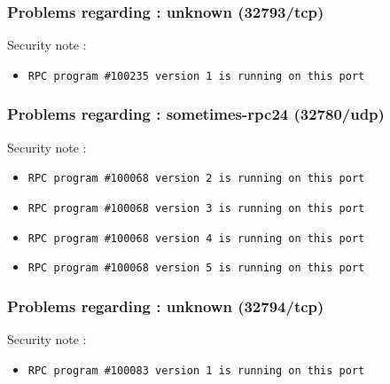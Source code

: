 \documentclass{article}
\begin{document}
\subsubsection{Problems regarding : unknown (32793/tcp)}
Security note :\\
\begin{itemize}
\item \begin{verbatim}
RPC program #100235 version 1 is running on this port
\end{verbatim}\end{itemize}
\subsubsection{Problems regarding : sometimes-rpc24 (32780/udp)}
Security note :\\
\begin{itemize}
\item \begin{verbatim}
RPC program #100068 version 2 is running on this port
\end{verbatim}\item \begin{verbatim}
RPC program #100068 version 3 is running on this port
\end{verbatim}\item \begin{verbatim}
RPC program #100068 version 4 is running on this port
\end{verbatim}\item \begin{verbatim}
RPC program #100068 version 5 is running on this port
\end{verbatim}\end{itemize}
\subsubsection{Problems regarding : unknown (32794/tcp)}
Security note :\\
\begin{itemize}
\item \begin{verbatim}
RPC program #100083 version 1 is running on this port
\end{verbatim}\end{itemize}
\end{document}
